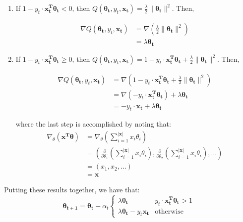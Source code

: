 \documentclass{article}
\renewcommand{\vec}[1]{\boldsymbol{#1}}
\newcommand{\pd}[2]{\frac{\partial#1}{\partial#2}}
\begin{document}
\begin{enumerate}
\item If $1-y_t\cdot\vec{x_t^{T}}\vec{\theta_t} < 0$, then $Q(\vec{\theta_{t}}, y_t, \vec{x_t}) = \frac{\lambda}{2}\|\vec{\theta_t}\|^2$. Then,

\begin{align*}
\nabla Q(\vec{\theta_{t}}, y_t, \vec{x_t}) &= \nabla\left(\frac{\lambda}{2}\|\vec{\theta_t}\|^2\right)\\
&= \lambda \vec{\theta_t}
\end{align*}

\item If $1-y_t\cdot\vec{x_t^{T}}\vec{\theta_t} \geq 0$, then $Q(\vec{\theta_{t}}, y_t, \vec{x_t}) = 1-y_t\cdot\vec{x_t^{T}}\vec{\theta_t}+\frac{\lambda}{2}\|\vec{\theta_t}\|^2$. Then,

\begin{align*}
\nabla Q(\vec{\theta_{t}}, y_t, \vec{x_t}) &= \nabla\left(1-y_t\cdot\vec{x_t^{T}}\vec{\theta_t}+\frac{\lambda}{2}\|\vec{\theta_t}\|^2\right)\\
&= \nabla\left( -y_t\cdot\vec{x_t^{T}}\vec{\theta_t} \right) + \lambda \vec{\theta_t}\\
&= -y_t\cdot\vec{x_t} + \lambda\vec{\theta_t}
\end{align*}

where the last step is accomplished by noting that:
\begin{align*}
\nabla_{\theta}\left(\vec{x^{T}}\vec{\theta}\right) &= \nabla_{\theta}\left(\sum_{i=1}^{|\vec{x}|} x_i\theta_i\right)\\
&= \left( \pd{}{\theta_1}\left(\sum_{i=1}^{|\vec{x}|} x_i\theta_i\right), \pd{}{\theta_2}\left(\sum_{i=1}^{|\vec{x}|} x_i\theta_i\right), \ldots \right)\\
&= \left( x_1, x_2, \ldots \right)\\
&= \vec{x}
\end{align*}

\end{enumerate}

Putting these results together, we have that:
\begin{equation}
\vec{\theta_{t+1}} = \vec{\theta_t} - \alpha_t \left\{ 
	\begin{array}{lr}
		\lambda\vec{\theta_t} &  y_t\cdot\vec{x_t^{T}}\vec{\theta_t} > 1\\
		\lambda\vec{\theta_t} - y_t\vec{x_t} &  \textrm{otherwise}
	\end{array}
\right.
\end{equation}
\end{document}

